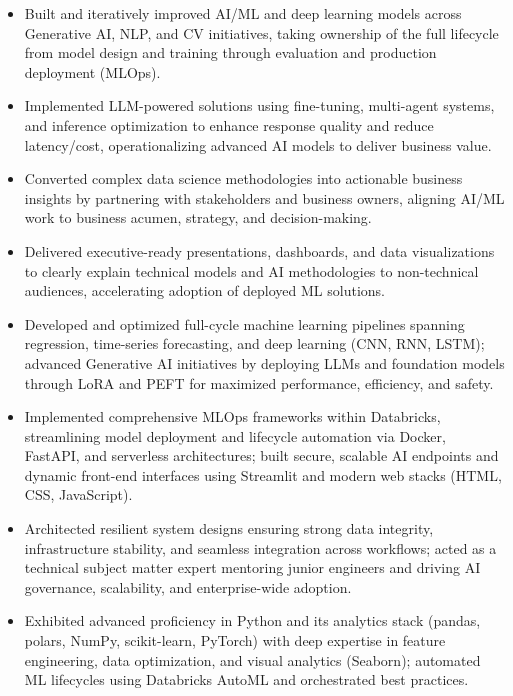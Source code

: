 \documentclass[11pt,letterpaper]{article}
\begin{document}
\begin{itemize}
  \item Built and iteratively improved AI/ML and deep learning models across Generative AI, NLP,
        and CV initiatives, taking ownership of the full lifecycle from model design and training
        through evaluation and production deployment (MLOps).

  \item Implemented LLM-powered solutions using fine-tuning, multi-agent systems, and inference
        optimization to enhance response quality and reduce latency/cost, operationalizing advanced
        AI models to deliver business value.

  \item Converted complex data science methodologies into actionable business insights by partnering
        with stakeholders and business owners, aligning AI/ML work to business acumen, strategy,
        and decision-making.

  \item Delivered executive-ready presentations, dashboards, and data visualizations to clearly
        explain technical models and AI methodologies to non-technical audiences, accelerating
        adoption of deployed ML solutions.

  \item Developed and optimized full-cycle machine learning pipelines spanning regression,
        time-series forecasting, and deep learning (CNN, RNN, LSTM); advanced Generative AI
        initiatives by deploying LLMs and foundation models through LoRA and PEFT for maximized
        performance, efficiency, and safety.

  \item Implemented comprehensive MLOps frameworks within Databricks, streamlining model deployment
        and lifecycle automation via Docker, FastAPI, and serverless architectures; built secure,
        scalable AI endpoints and dynamic front-end interfaces using Streamlit and modern web
        stacks (HTML, CSS, JavaScript).

  \item Architected resilient system designs ensuring strong data integrity, infrastructure
        stability, and seamless integration across workflows; acted as a technical subject matter
        expert mentoring junior engineers and driving AI governance, scalability, and
        enterprise-wide adoption.

  \item Exhibited advanced proficiency in Python and its analytics stack (pandas, polars, NumPy,
        scikit-learn, PyTorch) with deep expertise in feature engineering, data optimization, and
        visual analytics (Seaborn); automated ML lifecycles using Databricks AutoML and orchestrated
        best practices.


\end{itemize}
\end{document}
